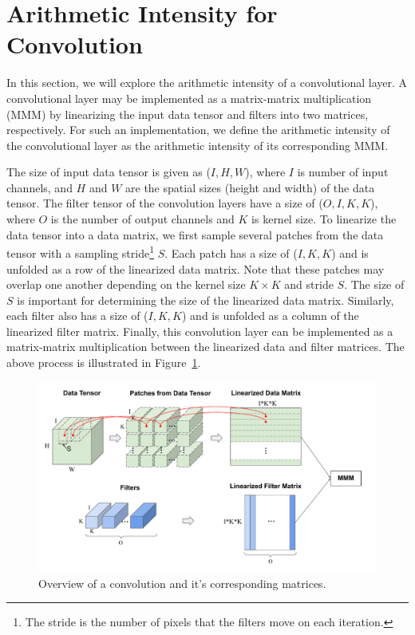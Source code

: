 \documentclass[a4 paper]{article}
\begin{document}
\section{Arithmetic Intensity for Convolution}
\label{sec:cnn_ai}
In this section, we will explore the arithmetic intensity of a convolutional layer.
A convolutional layer may be implemented as a matrix-matrix multiplication (MMM) by linearizing the input data tensor and filters into two matrices, respectively. 
For such an implementation, we define the arithmetic intensity of the convolutional layer as the arithmetic intensity of its corresponding MMM.

The size of input data tensor is given as ($I, H, W$), where $I$ is number of input channels, and $H$ and $W$ are the spatial sizes (height and width) of the data tensor. 
The filter tensor of the convolution layers have a size of ($O, I, K, K$), where $O$ is the number of output channels and $K$ is kernel size.
To linearize the data tensor into a data matrix, we first sample several patches from the data tensor with a sampling stride\footnote{The stride is the number of pixels that the filters move on each iteration.} $S$.
Each patch has a size of ($I, K, K$) and is unfolded as a row of the linearized data matrix. 
Note that these patches may overlap one another depending on the kernel size $K \times K$ and stride $S$. 
The size of $S$ is important for determining the size of the linearized data matrix.
Similarly, each filter also has a size of ($I, K, K$) and is unfolded as a column of the linearized filter matrix.
Finally, this convolution layer can be implemented as a matrix-matrix multiplication between the linearized data and filter matrices.
The above process is illustrated in Figure~\ref{fig:conv}.

\begin{figure}
    \centering
    \includegraphics[width=\linewidth]{figures/CS242-Conv.pdf}
    \caption{Overview of a convolution and it's corresponding matrices.}
    \label{fig:conv}
\end{figure}
\end{document}
